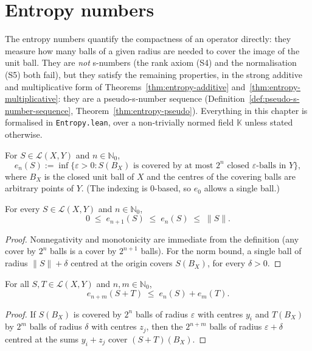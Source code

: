 \chapter{Entropy numbers}
\label{ch:entropy}

The entropy numbers quantify the compactness of an operator directly: they
measure how many balls of a given radius are needed to cover the image of
the unit ball. They are \emph{not} s-numbers (the rank axiom (S4) and
the normalisation (S5) both fail), but they satisfy the remaining
properties, in the strong additive and multiplicative form of
Theorems~\ref{thm:entropy-additive} and~\ref{thm:entropy-multiplicative}: they
are a pseudo-\textup{s}-number sequence
(Definition~\ref{def:pseudo-s-number-sequence},
Theorem~\ref{thm:entropy-pseudo}). Everything in this chapter is formalised
in \texttt{Entropy.lean}, over a non-trivially normed field
$\mathbb{K}$ unless stated otherwise.

\begin{definition}
\label{def:entropy-number}
\leanok
For $S \in \mathcal{L}(X, Y)$ and $n \in \mathbb{N}_0$,
\[
  e_n(S) := \inf \bigl\{ \varepsilon > 0 : S(B_X) \text{ is covered by at
  most } 2^n \text{ closed $\varepsilon$-balls in } Y \bigr\},
\]
where $B_X$ is the closed unit ball of $X$ and the centres of the covering
balls are arbitrary points of $Y$. (The indexing is $0$-based, so $e_0$
allows a single ball.)
\end{definition}

\begin{proposition}
\label{prop:entropy-basic}
\leanok
{}
For every $S \in \mathcal{L}(X, Y)$ and $n \in \mathbb{N}_0$,
\[
  0 \;\le\; e_{n+1}(S) \;\le\; e_n(S) \;\le\; \|S\| .
\]
\end{proposition}
\begin{proof}
\leanok
Nonnegativity and monotonicity are immediate from the definition (any
cover by $2^n$ balls is a cover by $2^{n+1}$ balls). For the norm bound,
a single ball of radius $\|S\| + \delta$ centred at the origin covers
$S(B_X)$, for every $\delta > 0$.
\end{proof}

\begin{theorem}
\label{thm:entropy-additive}
\leanok
{}
For all $S, T \in \mathcal{L}(X, Y)$ and $n, m \in \mathbb{N}_0$,
\[
  e_{n+m}(S + T) \;\le\; e_n(S) + e_m(T) .
\]
\end{theorem}
\begin{proof}
\leanok
{}
If $S(B_X)$ is covered by $2^n$ balls of radius $\varepsilon$ with centres
$y_i$ and $T(B_X)$ by $2^m$ balls of radius $\delta$ with centres $z_j$,
then the $2^{n+m}$ balls of radius $\varepsilon + \delta$ centred at the
sums $y_i + z_j$ cover $(S+T)(B_X)$.
\end{proof}

